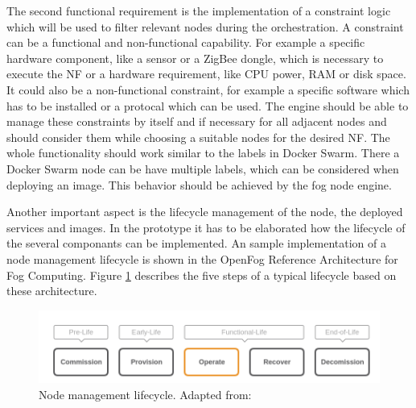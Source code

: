 The second functional requirement is the implementation of a constraint logic which will be used to filter relevant nodes during the orchestration.
A constraint can be a functional and non-functional capability.
For example a specific hardware component, like a sensor or a ZigBee dongle, which is necessary to execute the \ac{NF} or a hardware requirement, like \ac{CPU} power, \ac{RAM} or disk space.
It could also be a non-functional constraint, for example a specific software which has to be installed or a protocal which can be used.
The engine should be able to manage these constraints by itself and if necessary for all adjacent nodes and should consider them while choosing a suitable nodes for the desired \ac{NF}.
The whole functionality should work similar to the labels in Docker Swarm.
There a Docker Swarm node can be have multiple labels, which can be considered when deploying an image.
This behavior should be achieved by the fog node engine.

Another important aspect is the lifecycle management of the node, the deployed services and images.
In the prototype it has to be elaborated how the lifecycle of the several componants can be implemented.
An sample implementation of a node management lifecycle is shown in the OpenFog Reference Architecture for Fog Computing\autocite[p. 52]{OpenFog:2017}.
Figure \ref{fig:open_fog_node_mgm_lifecycle} describes the five steps of a typical lifecycle based on these architecture.
\begin{figure}[H]
    \centering
    \includegraphics[width=\textwidth]{resources/images/node_management_lifecycle.png}
    \caption[Node management lifecycle]{Node management lifecycle. Adapted from: \autocite[p. 52]{OpenFog:2017}}
    \label{fig:open_fog_node_mgm_lifecycle}
\end{figure}

